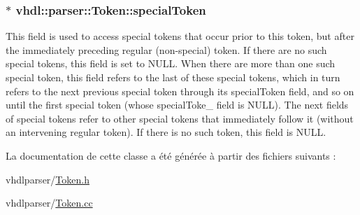 \subsubsection[{special\+Token}]{$\ast$ vhdl\+::parser\+::\+Token\+::special\+Token}\label{classvhdl_1_1parser_1_1_token_a9d02434823908bf848cdc9bb14f52b73}
This field is used to access special tokens that occur prior to this token, but after the immediately preceding regular (non-\/special) token. If there are no such special tokens, this field is set to N\+U\+L\+L. When there are more than one such special token, this field refers to the last of these special tokens, which in turn refers to the next previous special token through its special\+Token field, and so on until the first special token (whose special\+Toke\+\_\+ field is N\+U\+L\+L). The next fields of special tokens refer to other special tokens that immediately follow it (without an intervening regular token). If there is no such token, this field is N\+U\+L\+L. 

La documentation de cette classe a été générée à partir des fichiers suivants \+:\begin{DoxyCompactItemize}
\item 
vhdlparser/\hyperlink{_token_8h}{Token.\+h}\item 
vhdlparser/\hyperlink{_token_8cc}{Token.\+cc}\end{DoxyCompactItemize}
